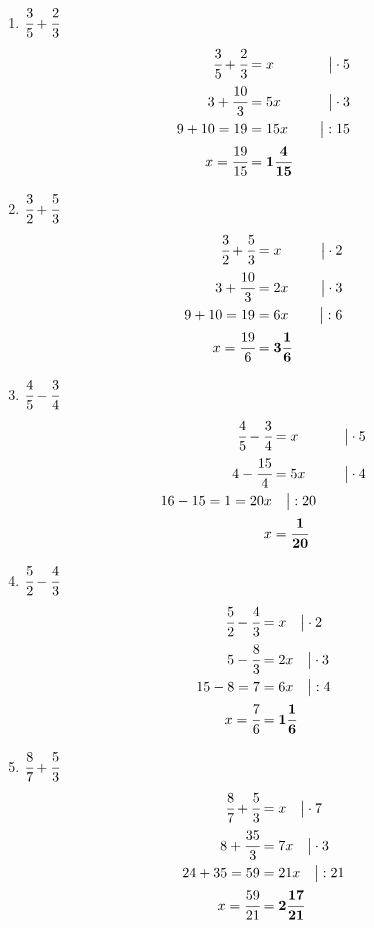 \documentclass[a4paper,10pt]{article} %
\begin{document}
\begin{enumerate}[label=\alph*)]

  \item \(\cfrac{3}{5} + \cfrac{2}{3}\)
  \[
    \begin{aligned}
      \cfrac{3}{5} + \cfrac{2}{3} &= x &\quad\big| \cdot 5 \\
      3 + \cfrac{10}{3} &= 5x &\quad\big| \cdot 3 \\
      9 + 10 = 19 &= 15x &\quad\big| : 15 \\
      x = \cfrac{19}{15} &= \mathbf{1\cfrac{4}{15}}
    \end{aligned}
  \]

  \item \(\cfrac{3}{2} + \cfrac{5}{3}\)
  \[
    \begin{aligned}
      \cfrac{3}{2} + \cfrac{5}{3} &= x &\quad\big| \cdot 2 \\
      3 + \cfrac{10}{3} &= 2x &\quad\big| \cdot 3 \\
      9 + 10 = 19 &= 6x &\quad\big| : 6 \\
      x = \cfrac{19}{6} &= \mathbf{3\cfrac{1}{6}}
    \end{aligned}
  \]

  \item \(\cfrac{4}{5} - \cfrac{3}{4}\)
  \[
    \begin{aligned}
      \cfrac{4}{5} - \cfrac{3}{4} &= x &\quad\big| \cdot 5 \\
      4 - \cfrac{15}{4} &= 5x &\quad\big| \cdot 4 \\
      16 - 15 = 1 = 20x &\quad\big| : 20 \\
      x &= \mathbf{\cfrac{1}{20}}
    \end{aligned}
  \]

  \item \(\cfrac{5}{2} - \cfrac{4}{3}\)
  \[
    \begin{aligned}
      \cfrac{5}{2} - \cfrac{4}{3} &= x \quad\big| \cdot 2 \\
      5 - \cfrac{8}{3} &= 2x \quad\big| \cdot 3 \\
      15 - 8 = 7 &= 6x \quad\big| : 4 \\
      x = \cfrac{7}{6} &= \mathbf{1\cfrac{1}{6}}
    \end{aligned}
  \]

  \item \(\cfrac{8}{7} + \cfrac{5}{3}\)
  \[
    \begin{aligned}
      \cfrac{8}{7} + \cfrac{5}{3} &= x \quad\big| \cdot 7 \\
      8 + \cfrac{35}{3} &= 7x \quad\big| \cdot 3 \\
      24 + 35 = 59 &= 21x \quad\big| : 21 \\
      x = \cfrac{59}{21} &= \mathbf{2\cfrac{17}{21}}
    \end{aligned}
  \]


\end{enumerate}
\end{document}
